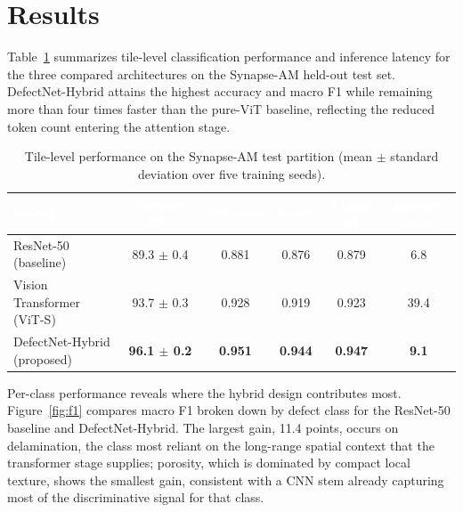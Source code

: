 \section{Results}
Table~\ref{tab:results} summarizes tile-level classification performance and inference latency for the three compared architectures on the Synapse-AM held-out test set. DefectNet-Hybrid attains the highest accuracy and macro F1 while remaining more than four times faster than the pure-ViT baseline, reflecting the reduced token count entering the attention stage.

\begin{table}[H]
\centering
\caption{Tile-level performance on the Synapse-AM test partition (mean $\pm$ standard deviation over five training seeds).}
\label{tab:results}
\begin{tabular}{lccccc}
\toprule
\rowcolor{mdpiblue}
\textcolor{white}{\textbf{Model}} & \textcolor{white}{\textbf{Accuracy (\%)}} & \textcolor{white}{\textbf{Precision}} & \textcolor{white}{\textbf{Recall}} & \textcolor{white}{\textbf{Macro F1}} & \textcolor{white}{\textbf{Latency (ms)}} \\
\midrule
ResNet-50 (baseline) & 89.3 $\pm$ 0.4 & 0.881 & 0.876 & 0.879 & 6.8 \\
Vision Transformer (ViT-S) & 93.7 $\pm$ 0.3 & 0.928 & 0.919 & 0.923 & 39.4 \\
\rowcolor{mdpilight}
DefectNet-Hybrid (proposed) & \textbf{96.1 $\pm$ 0.2} & \textbf{0.951} & \textbf{0.944} & \textbf{0.947} & \textbf{9.1} \\
\bottomrule
\end{tabular}
\end{table}

Per-class performance reveals where the hybrid design contributes most. Figure~\ref{fig:f1} compares macro F1 broken down by defect class for the ResNet-50 baseline and DefectNet-Hybrid. The largest gain, 11.4 points, occurs on delamination, the class most reliant on the long-range spatial context that the transformer stage supplies; porosity, which is dominated by compact local texture, shows the smallest gain, consistent with a CNN stem already capturing most of the discriminative signal for that class.

